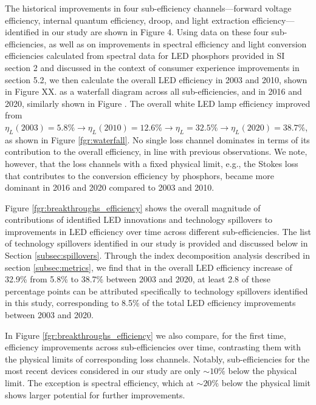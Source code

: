 \documentclass[twoside,twocolumn,9pt]{article}
\begin{document}
The historical improvements in four sub-efficiency channels—forward voltage efficiency, internal quantum efficiency, droop, and light extraction efficiency—identified in our study are shown in Figure 4. Using data on these four sub-efficiencies, as well as on improvements in spectral efficiency and light conversion efficiencies calculated from spectral data for LED phosphors provided in SI section 2 and discussed in the context of consumer experience improvements in section 5.2, we then calculate the overall LED efficiency in 2003 and 2010, shown in Figure XX. as a waterfall diagram across all sub-efficiencies, and in 2016 and 2020, similarly shown in Figure . The overall white LED lamp efficiency improved from $\eta_L(2003)=5.8\% \rightarrow \eta_L (2010) = 12.6\% \rightarrow \eta_L = 32.5\% \rightarrow \eta_L(2020) = 38.7\%$, as shown in Figure \ref{fgr:waterfall}. No single loss channel dominates in terms of its contribution to the overall efficiency, in line with previous observations\cite{tsao2010solid}. We note, however, that the loss channels with a fixed physical limit, e.g., the Stokes loss that contributes to the conversion efficiency by phosphors, became more dominant in 2016 and 2020 compared to 2003 and 2010. 

Figure \ref{fgr:breakthroughs_efficiency} shows the overall magnitude of contributions of identified LED innovations and technology spillovers to improvements in LED efficiency over time across different sub-efficiencies. The list of technology spillovers identified in our study is provided and discussed below in Section \ref{subsec:spillovers}. Through the index decomposition analysis described in section \ref{subsec:metrics}, we find that in the overall LED efficiency increase of 32.9\% from 5.8\% to 38.7\% between 2003 and 2020, at least 2.8 of these percentage points can be attributed specifically to technology spillovers identified in this study, corresponding to 8.5\% of the total LED efficiency improvements between 2003 and 2020.

In Figure \ref{fgr:breakthroughs_efficiency} we also compare, for the first time, efficiency improvements across sub-efficiencies over time, contrasting them with the physical limits of corresponding loss channels. Notably, sub-efficiencies for the most recent devices considered in our study are only $\sim10\%$ below the physical limit. The exception is spectral efficiency, which at $\sim20\%$ below the physical limit shows larger potential for further improvements.
\end{document}
